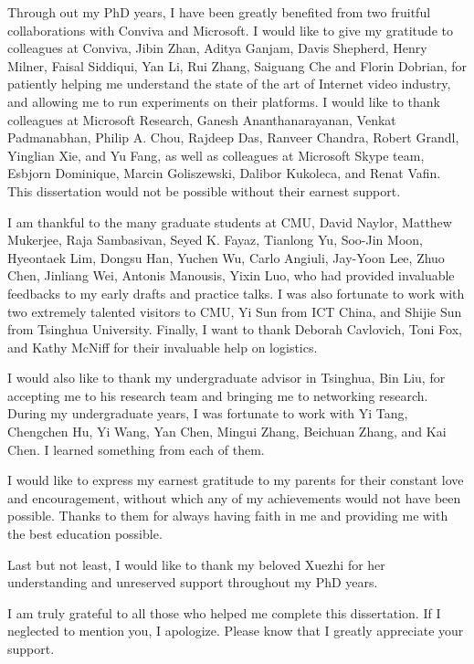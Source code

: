 \documentclass[12pt]{ZHU-cmuthesis}
\begin{document}
\begin{acknowledgments}
%
Through out my PhD years, I have been greatly benefited from two fruitful collaborations with Conviva and Microsoft. 
I would like to give my gratitude to colleagues at Conviva, Jibin Zhan, Aditya Ganjam, Davis Shepherd, Henry Milner, Faisal Siddiqui, Yan Li, Rui Zhang, Saiguang Che and Florin Dobrian, for patiently helping me understand the state of the art of Internet video industry, and allowing me to run experiments on their platforms. 
I would like to thank colleagues at Microsoft Research, Ganesh Ananthanarayanan, Venkat Padmanabhan, Philip A. Chou, Rajdeep Das, Ranveer Chandra, Robert Grandl, Yinglian Xie, and Yu Fang, as well as colleagues at Microsoft Skype team, Esbjorn Dominique, Marcin Goliszewski, Dalibor Kukoleca, and Renat Vafin.
This dissertation would not be possible without their earnest support.

%
I am thankful to the many graduate students at CMU, David Naylor, Matthew Mukerjee, Raja Sambasivan, Seyed K. Fayaz, Tianlong Yu,  Soo-Jin Moon, Hyeontaek Lim, Dongsu Han, Yuchen Wu, Carlo Angiuli, Jay-Yoon Lee, Zhuo Chen, Jinliang Wei, Antonis Manousis, Yixin Luo, who had provided invaluable feedbacks to my early drafts and practice talks. I was also fortunate to work with two extremely talented visitors to CMU, Yi Sun from ICT China, and Shijie Sun from Tsinghua University. Finally, I want to thank Deborah Cavlovich, Toni Fox, and Kathy McNiff for their invaluable help on logistics.

%
I would also like to thank my undergraduate advisor in Tsinghua, Bin Liu, for accepting me to his research team and bringing me to networking research. During my undergraduate years, I was fortunate to work with Yi Tang, Chengchen Hu, Yi Wang, Yan Chen, Mingui Zhang, Beichuan Zhang, and Kai Chen. I learned something from each of them.


I would like to express my earnest gratitude to my parents for their constant love and encouragement, without which any of my achievements would not have been possible. Thanks to them for always having faith in me and providing me with the best education possible.

Last but not least, I would like to thank my beloved Xuezhi for her understanding and unreserved support throughout my PhD years.

I am truly grateful to all those who helped me complete this dissertation. If I neglected to
mention you, I apologize. Please know that I greatly appreciate your support.

\end{acknowledgments}
\end{document}
